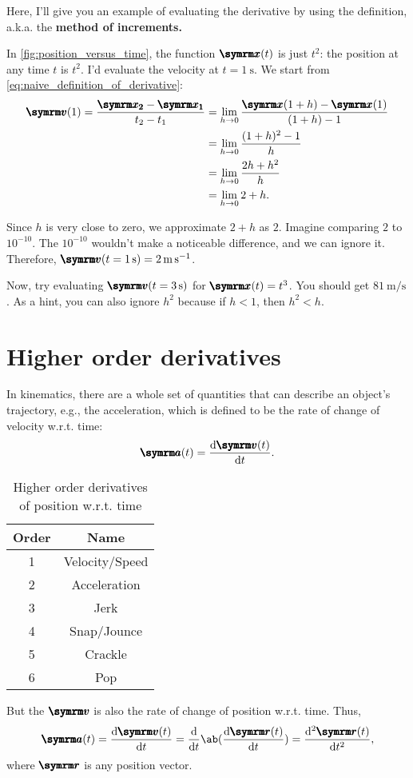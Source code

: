 Here, I'll give you an example of evaluating the derivative by using the definition, a.k.a. the \textbf{method of increments.}

In \cref{fig:position_versus_time}, the function $\vv{x}(t)$ is just $t^2$: the position at any time $t$ is $t^2$. I'd evaluate the velocity at $t = \qty{1}{\second}$. We start from \cref{eq:naive_definition_of_derivative}:
\begin{align*}
    \vv{v}(1) = \frac{\vv{x_2} - \vv{x_1}}{t_2 - t_1} &= \lim_{h \appr 0}\frac{\vv{x}(1 + h) - \vv{x}(1)}{(1 + h) - 1} \\
    &= \lim_{h \appr 0}\frac{(1 + h)^2 - 1}{h} \\
    &= \lim_{h \appr 0}\frac{2h + h^2}{h} \\
    &= \lim_{h \appr 0}2 + h.
\end{align*}

Since $h$ is very close to zero, we approximate $2 + h$ as $2$. Imagine comparing $2$ to $10^{-10}$. The $10^{-10}$ wouldn't make a noticeable difference, and we can ignore it. Therefore, $\vv{v}(t = \qty{1}{\second}) = \qty{2}{\meter\per\second}$.

Now, try evaluating $\vv{v}(t = \qty{3}{\second})$ for $\vv{x}(t) = t^3$. You should get $\qty{81}{\meter\per\second}$. As a hint, you can also ignore $h^2$ because if $h < 1$, then $h^2 < h$.

\section{Higher order derivatives}

In kinematics, there are a whole set of quantities that can describe an object's trajectory, e.g., the acceleration, which is defined to be the rate of change of velocity w.r.t. time:
\begin{equation*}
    \vv{a}(t) = \odv{\vv{v}(t)}{t}.
\end{equation*}
\begin{wraptable}[12]{l}{0.35\textwidth}
    \begin{tabular}{c | c}
        Order & Name \\
        \hline
        1 & Velocity/Speed \\
        2 & Acceleration \\
        3 & Jerk \\
        4 & Snap/Jounce \\
        5 & Crackle \\
        6 & Pop
    \end{tabular}
    \caption{Higher order derivatives of position w.r.t. time}
    \label{tab:jerksnapcracklepop}
\end{wraptable}
But the $\vv{v}$ is also the rate of change of position w.r.t. time. Thus,
\begin{equation*}
    \vv{a}(t) = \odv{\vv{v}(t)}{t} = \odv*{\ab(\odv{\vv{r}(t)}{t})}{t} = \odv[ord = 2]{\vv{r}(t)}{t}, 
\end{equation*}
where $\vv{r}$ is any position vector.

